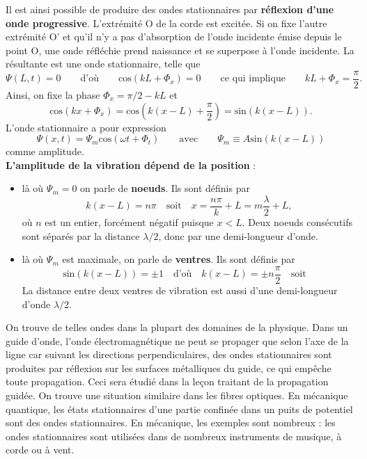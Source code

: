 \documentclass[11pt,a4paper]{report}
\begin{document}
Il est ainsi possible de produire des ondes stationnaires par \textbf{réflexion d'une onde progressive}. L'extrémité O de la corde est excitée. Si on fixe l'autre extrémité O' et qu'il n'y a pas d'absorption de l'onde incidente émise depuis le point O, une onde réfléchie prend naissance et se superpose à l'onde incidente. La résultante est une onde stationnaire, telle que 
\begin{equation}
	\Psi(L,t) = 0 \qquad\text{d'où}\qquad\text{cos}(kL + \Phi_x) = 0 \qquad\text{ce qui implique}\qquad kL + \Phi_x = \frac{\pi}{2}.
\end{equation}
Ainsi, on fixe la phase $\Phi_x = \pi/2 - kL$ et
\begin{equation}
	\text{cos}(kx + \Phi_x) = \text{cos}(k(x-L) + \frac{\pi}{2}) = \text{sin}(k(x-L)).
\end{equation}
L'onde stationnaire a pour expression
\begin{equation}
	\Psi(x,t) = \Psi_m \text{cos}(\omega t + \Phi_t) \qquad\text{avec}\qquad \Psi_m \equiv A\text{sin}(k(x-L))
\end{equation}
comme amplitude.\\ 

\textbf{L'amplitude de la vibration dépend de la position} :
\begin{itemize}
	\item là où $\Psi_m = 0$ on parle de \textbf{noeuds}. Ils sont définis par
	\begin{equation}
		k(x-L) = n\pi \quad\text{soit}\quad x = \frac{n\pi}{k} + L = m\frac{\lambda}{2} + L,
	\end{equation}
	où $n$ est un entier, forcément négatif puisque $x < L$. Deux noeuds consécutifs sont séparés par la distance $\lambda/2$, donc par une demi-longueur d'onde.
	
	\item là où $\Psi_m$ est maximale, on parle de \textbf{ventres}. Ils sont définis par
	\begin{equation}
		\text{sin}(k(x-L)) = \pm 1 \quad\text{d'où}\quad k(x-L) = \pm n\frac{\pi}{2} \quad\text{soit}\quad
	\end{equation}
	La distance entre deux ventres de vibration est aussi d'une demi-longueur d'onde $\lambda/2$.
\end{itemize}

On trouve de telles ondes dans la plupart des domaines de la physique. Dans un guide d'onde, l'onde électromagnétique ne peut se propager que selon l'axe de la ligne car suivant les directions perpendiculaires, des ondes stationnaires sont produites par réflexion sur les surfaces métalliques du guide, ce qui empêche toute propagation. Ceci sera étudié dans la leçon traitant de la propagation guidée. On trouve une situation similaire dans les fibres optiques. En mécanique quantique, les états stationnaires d'une partie confinée dans un puits de potentiel sont des ondes stationnaires. En mécanique, les exemples sont nombreux : les ondes stationnaires sont utilisées dans de nombreux instruments de musique, à corde ou à vent.
\end{document}
